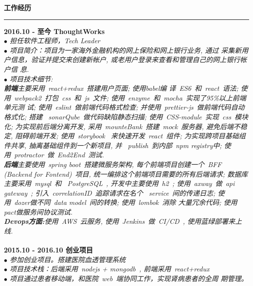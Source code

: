 \documentclass[a4paper,12pt,final]{memoir}
\newcommand{\myThemeColor}{RoyalBlue}
\newcommand{\SmallSep}{\vspace{0.9em}}
\newcommand{\CVSection}[1]
	{\Large\textbf{#1}\par
	\vspace{0.2cm}\normalsize\normalfont}
\newcommand{\CVItem}[1]
	{\textbf{\color{\myThemeColor} #1}}
\begin{document}
\begin{CJK*}{UTF8}{gbsn}
\CVSection{工作经历}
\hrule
\SmallSep
\CVItem{2016.10 - 至今 \hfill ThoughtWorks}\\
\textit{$\bullet$ 担任软件工程师，Tech Leader} \\
\textit{$\bullet$ 项目简介：项目为一家海外金融机构的网上保险和网上银行业务, 通过
  采集新用户信息，验证并提交来创建新帐户, 或老用户登录来查看和管理自己的网上银行帐户信
  息.} \\
\textit{$\bullet$ 项目技术细节: \\\textbf{前端}主要采用~react+redux~搭建用户页面; 使用babel编
  译~ES6~和~react~语法; 使用~webpack2~打包~css~和~js~文件; 使用~enzyme~和~mocha~实现了95\%以上前端单元测
  试; 使用~eslint~做前端代码格式检查; 并使用~prettier-js~做前端代码自动格式化; 搭建
  ~sonarQube~做代码缺陷静态扫描; 使用~CSS-module~实现~css~模块化; 为实现前后端分离开发,
  采用~mounteBank~搭建~mock~服务器, 避免后端不稳定, 阻碍前端开发; 使用~storybook~
  来快速开发~react~组件; 为实现跨项目基础组件共享, 抽离基础组件到一个新项目, 并
  ~publish~到内部~npm registry中; 使用~protractor~做~End2End~测试.\\
  \textbf{后端}主要使用~spring boot~搭建微服务架构, 每个前端项目创建一个~BFF (Backend for
  Fontend)~项目, 统一编排这个前端项目需要的所有后端请求; 数据库主要采用~mysql~和
  ~PostgreSQL~, 开发中主要使用~h2~; 使用~axway~做~api gateway~; 引入~correlationID~追踪请求在名个
  ~service~间的传递日志; 使用~dozer做不同~data model~间的转换; 使用~lombok~消除
  大量冗余代码; 使用pact做服务间协议测试. \\
  \textbf{Devops方面:}使用~AWS~云服务, 使用~Jenkins~做~CI/CD~, 使用蓝绿部署来上线.} \\
\\
\CVItem{2015.10 - 2016.10 \hfill 创业项目}\\
\textit{$\bullet$ 参加创业项目。搭建医院血透管理系统} \\
\textit{$\bullet$ 项目技术栈：后端采用~nodejs + mongodb~, 前端采用~react+redux~} \\
\textit{$\bullet$ 项目通过患者移动端，和医院~web~端协同工作，实现肾病患者的全周
  期管理。}\\
\\


\end{CJK*}
\end{document}
